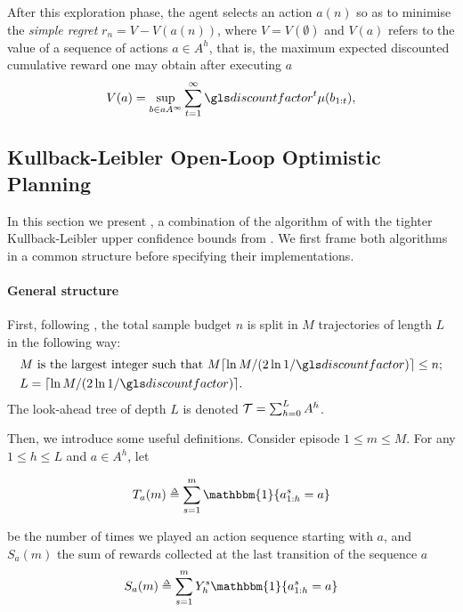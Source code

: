 After this exploration phase, the agent selects an action $a(n)$ so as to minimise the \emph{simple regret} $r_n = V - V(a(n))$, where $V=V(\emptyset)$ and $V(a)$ refers to the value of a sequence of actions $a\in A^h$, that is, the maximum expected discounted cumulative reward one may obtain after executing $a$
\begin{equation}
\label{eq:value}
V(a) = \sup_{b\in aA^\infty} \sum_{t=1}^\infty \discount^t\mu(b_{1:t}),
\end{equation}


\subsection{Kullback-Leibler Open-Loop Optimistic Planning}
\label{sec:kl-olop}

In this section we present \KLOLOP, a combination of the \OLOP algorithm of \citep{Bubeck2010} with the tighter Kullback-Leibler upper confidence bounds from \citep{Cappe2013}. We first frame both algorithms in a common structure before specifying their implementations.

\paragraph{General structure}

First, following \OLOP, the total sample budget $n$ is split in $M$ trajectories of length $L$ in the following way: 
\begin{align*}
&M\text{ is the largest integer such that } M \ceil{\log M/(2 \log 1/\discount)} \leq n;\\
&L= \ceil{\log M / (2 \log 1/\discount)}.
\end{align*}
The look-ahead tree of depth $L$ is denoted $\mathcal{T} = \sum_{h=0}^L A^h$.

Then, we introduce some useful definitions. Consider episode $1 \leq m \leq M$. For any $1 \leq h \leq L$ and $a\in A^h$, let 


\begin{equation*}
T_a(m) \eqdef \sum_{s=1}^m \mathbbm{1}\{a^s_{1:h} = a\}
\end{equation*}


\noindent
be the number of times we played an action sequence starting with $a$, and $S_a(m)$ the sum of rewards collected at the last transition of the sequence $a$
\begin{equation*}
S_a(m) \eqdef \sum_{s=1}^m Y^s_h \mathbbm{1}\{a^s_{1:h} = a\}
\end{equation*}


